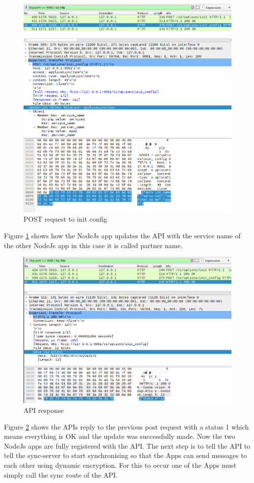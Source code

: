 \begin{figure}[!h]
  \centering
      \includegraphics[width=1\textwidth]{Figures/b6.png}
  \caption[POST request to init config]{POST request to init config}
  \label{fig:b6}
\end{figure}
\FloatBarrier
Figure \ref{fig:b6} shows how the NodeJs app updates the API with the service name of the other NodeJs app in this case it is called partner name.

\begin{figure}[!h]
  \centering
      \includegraphics[width=1\textwidth]{Figures/b7.png}
  \caption[API response]{API response}
  \label{fig:b7}
\end{figure}
\FloatBarrier
Figure \ref{fig:b7} shows the APIs reply to the previous post request with a status 1 which means everything is OK and the update was successfully made.
Now the two NodeJs apps are fully registered with the API. The next step is to tell the API to tell the sync-server to start synchronising so that the Apps can send messages to each other using dynamic encryption.
For this to occur one of the Apps must simply call the sync route of the API.

